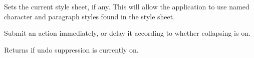 
Sets the current style sheet, if any. This will allow the application to use
named character and paragraph styles found in the style sheet.

\label{wxrichtextbuffersubmitaction}


Submit an action immediately, or delay it according to whether collapsing is on.

\label{wxrichtextbuffersuppressingundo}


Returns \true if undo suppression is currently on.


